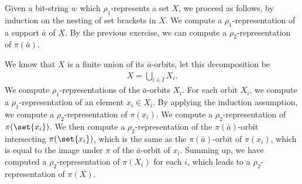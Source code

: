 {Given a bit-string $w$ which $\rho_1$-represents a set $X$, we proceed as follows, by induction on the nesting of set brackets in $X$. We compute a $\rho_1$-representation of a support $\bar a$ of $X$. By the previous exercise, we can compute a $\rho_2$-representation of $\pi(\bar a)$.

We know that $X$ is a finite union of its $\bar a$-orbits, let this decomposition be
\begin{align*}
	X = \bigcup_{i \in I} X_i.
\end{align*}
 We compute $\rho_1$-representations of the $\bar a$-orbits $X_i$. For each orbit $X_i$, we compute a $\rho_1$-representation of an element $x_i \in X_i$. By applying the induction assumption, we compute a $\rho_2$-representation of $\pi(x_i)$. We compute a $\rho_2$-representation of $\pi(\set{x_i})$. We then compute a $\rho_2$-representation of the $\pi(\bar a)$-orbit intersecting $\pi(\set{x_i})$, which is the same as the $\pi(\bar a)$-orbit of $\pi(x_i)$, which is equal to the image under $\pi$ of the $\bar a$-orbit of $x_i$. Summing up, we have computed a $\rho_2$-representation of $\pi(X_i)$ for each $i$, which leads to a $\rho_2$-representation of $\pi(X)$.}
% 
% 
% 
% 

